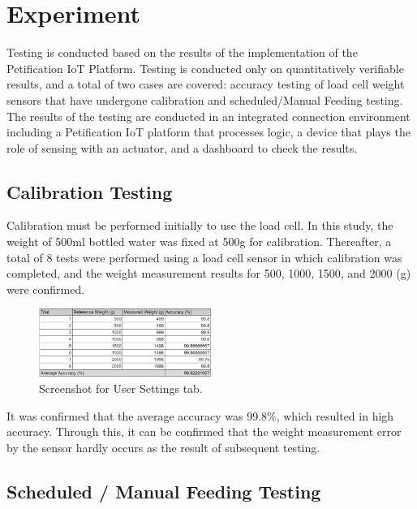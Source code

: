 \documentclass[conference]{IEEEtran}
\begin{document}
\section{Experiment}
Testing is conducted based on the results of the implementation of the Petification IoT Platform. Testing is conducted only on quantitatively verifiable results, and a total of two cases are covered: accuracy testing of load cell weight sensors that have undergone calibration and scheduled/Manual Feeding testing. The results of the testing are conducted in an integrated connection environment including a Petification IoT platform that processes logic, a device that plays the role of sensing with an actuator, and a dashboard to check the results.

\subsection{Calibration Testing}
Calibration must be performed initially to use the load cell. 
In this study, the weight of 500ml bottled water was fixed at 500g for calibration. Thereafter, a total of 8 tests were performed using a load cell sensor in which calibration was completed, and the weight measurement results for 500, 1000, 1500, and 2000 (g) were confirmed.

\begin{figure}[htbp]
\centerline{\includegraphics[width=0.5\textwidth]{./images/Calibration_sheet.jpg}}
\caption{Screenshot for User Settings tab.}
\label{fig}
\end{figure}

It was confirmed that the average accuracy was 99.8\%, which resulted in high accuracy. Through this, it can be confirmed that the weight measurement error by the sensor hardly occurs as the result of subsequent testing.

\subsection{Scheduled / Manual Feeding Testing}
\end{document}
